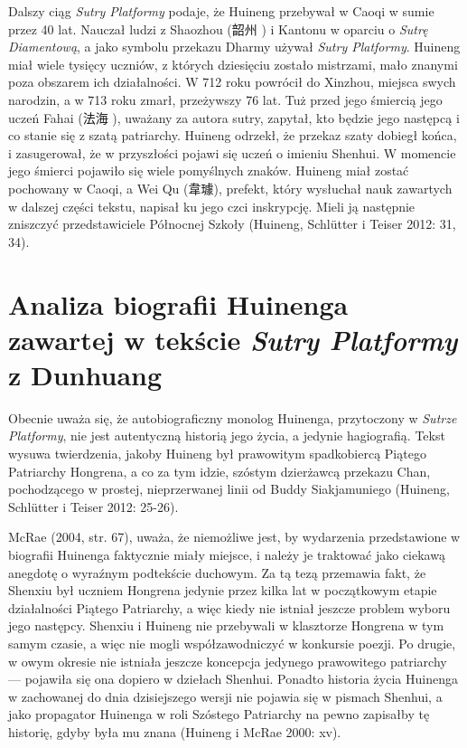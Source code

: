 Dalszy ciąg \textit{Sutry Platformy} podaje, że Huineng przebywał w Caoqi w sumie przez 40 lat.
Nauczał ludzi z Shaozhou (韶州 ) i Kantonu w oparciu o \textit{Sutrę Diamentową}, a jako symbolu przekazu Dharmy używał \textit{Sutry Platformy}. Huineng miał wiele tysięcy uczniów, z których dziesięciu zostało mistrzami, mało znanymi poza obszarem ich działalności.
W 712 roku powrócił do Xinzhou, miejsca swych narodzin, a w 713 roku zmarł, przeżywszy 76 lat.
Tuż przed jego śmiercią jego uczeń Fahai (法海 ), uważany za autora sutry, zapytał, kto będzie jego następcą i co stanie się z szatą patriarchy.
Huineng odrzekł, że przekaz szaty dobiegł końca, i zasugerował, że w przyszłości pojawi się uczeń o imieniu Shenhui. W momencie jego śmierci pojawiło się wiele pomyślnych znaków. Huineng miał zostać pochowany w Caoqi, a Wei Qu (韋璩), prefekt, który wysłuchał nauk zawartych w dalszej części tekstu, napisał ku jego czci inskrypcję. Mieli ją następnie zniszczyć przedstawiciele Północnej Szkoły
(Huineng, Schlütter i Teiser 2012: 31, 34).

\section{Analiza biografii Huinenga zawartej w tekście \textit{Sutry Platformy} z Dunhuang}
Obecnie uważa się, że autobiograficzny monolog Huinenga, przytoczony w \textit{Sutrze Platformy}, nie jest autentyczną historią jego życia, a jedynie hagiografią.
Tekst wysuwa twierdzenia, jakoby Huineng był prawowitym spadkobiercą Piątego Patriarchy Hongrena, a co za tym idzie, szóstym dzierżawcą przekazu Chan, pochodzącego w prostej, nieprzerwanej linii od Buddy Siakjamuniego
(Huineng, Schlütter i Teiser 2012: 25-26).

McRae (2004, str. 67), uważa, że niemożliwe jest, by wydarzenia przedstawione w biografii Huinenga faktycznie miały miejsce, i należy je traktować jako ciekawą anegdotę o wyraźnym podtekście duchowym.
Za tą tezą przemawia fakt, że Shenxiu był uczniem Hongrena jedynie przez kilka lat w początkowym etapie działalności Piątego Patriarchy, a więc kiedy nie istniał jeszcze problem wyboru jego następcy. Shenxiu i Huineng nie przebywali w klasztorze Hongrena w tym samym czasie, a więc nie mogli współzawodniczyć w konkursie poezji.
Po drugie, w owym okresie nie istniała jeszcze koncepcja jedynego prawowitego patriarchy --- pojawiła się ona dopiero w dziełach Shenhui. Ponadto historia życia Huinenga w zachowanej do dnia dzisiejszego wersji nie pojawia się w pismach Shenhui, a jako propagator Huinenga w roli Szóstego Patriarchy na pewno zapisałby tę historię, gdyby była mu znana
(Huineng i McRae 2000: xv).

